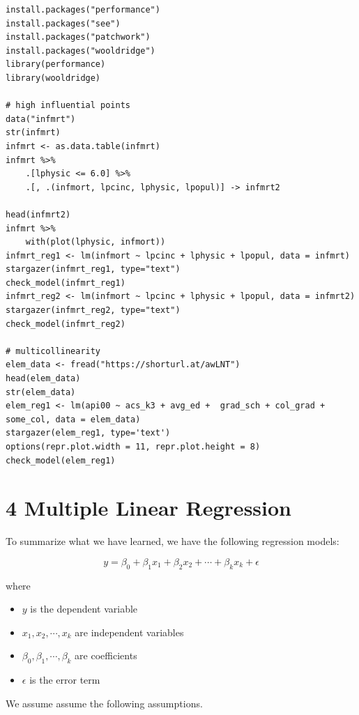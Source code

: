 \documentclass[11pt]{article}
\theoremstyle{definition}
\providecommand{\tightlist}{%
\setlength{\itemsep}{0pt}\setlength{\parskip}{0pt}}
\begin{document}
\begin{lstlisting}
install.packages("performance")
install.packages("see")
install.packages("patchwork")
install.packages("wooldridge")
library(performance)
library(wooldridge)

# high influential points
data("infmrt")
str(infmrt)
infmrt <- as.data.table(infmrt)
infmrt %>%
    .[lphysic <= 6.0] %>%
    .[, .(infmort, lpcinc, lphysic, lpopul)] -> infmrt2 

head(infmrt2)
infmrt %>%
    with(plot(lphysic, infmort))
infmrt_reg1 <- lm(infmort ~ lpcinc + lphysic + lpopul, data = infmrt)
stargazer(infmrt_reg1, type="text")
check_model(infmrt_reg1)
infmrt_reg2 <- lm(infmort ~ lpcinc + lphysic + lpopul, data = infmrt2)
stargazer(infmrt_reg2, type="text")
check_model(infmrt_reg2)

# multicollinearity
elem_data <- fread("https://shorturl.at/awLNT")
head(elem_data)
str(elem_data)
elem_reg1 <- lm(api00 ~ acs_k3 + avg_ed +  grad_sch + col_grad + some_col, data = elem_data)
stargazer(elem_reg1, type='text')
options(repr.plot.width = 11, repr.plot.height = 8)
check_model(elem_reg1)
\end{lstlisting}





\section{4 Multiple Linear Regression}

To summarize what we have learned, we have the following regression models:

\begin{equation}
  y = \beta_0 + \beta_1 x_1 + \beta_2 x_2 + \cdots + \beta_k x_k + \epsilon
\end{equation}

where

\begin{itemize}
  \tightlist
  \item $y$ is the dependent variable
  \item $x_1, x_2, \cdots, x_k$ are independent variables
  \item $\beta_0, \beta_1, \cdots, \beta_k$ are coefficients
  \item $\epsilon$ is the error term
\end{itemize}

We assume assume the following assumptions. 
\end{document}
